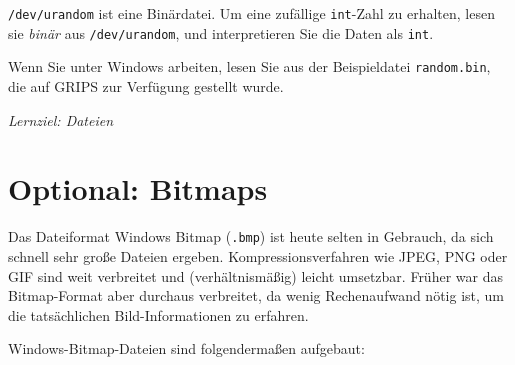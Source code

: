\documentclass[
	ngerman,
	fontsize=10pt,
	parskip=half,
	titlepage=true,
	DIV=12
]{scrartcl}
\begin{document}
\texttt{/dev/urandom} ist eine Binärdatei. Um eine zufällige \texttt{int}-Zahl zu erhalten,
lesen sie \emph{binär} aus \texttt{/dev/urandom}, und interpretieren Sie die Daten als \texttt{int}.

Wenn Sie unter Windows arbeiten, lesen Sie aus der Beispieldatei \texttt{random.bin}, die auf GRIPS zur Verfügung gestellt wurde.

\emph{Lernziel: Dateien}



\section{Optional: Bitmaps}
Das Dateiformat Windows Bitmap (\texttt{.bmp}) ist heute selten in Gebrauch, da sich schnell sehr große Dateien ergeben. Kompressionsverfahren wie JPEG, PNG oder GIF sind weit verbreitet und (verhältnismäßig) leicht umsetzbar. Früher war das Bitmap-Format aber durchaus verbreitet, da wenig Rechenaufwand nötig ist, um die tatsächlichen Bild-Informationen zu erfahren.

Windows-Bitmap-Dateien sind folgendermaßen aufgebaut:
\end{document}
